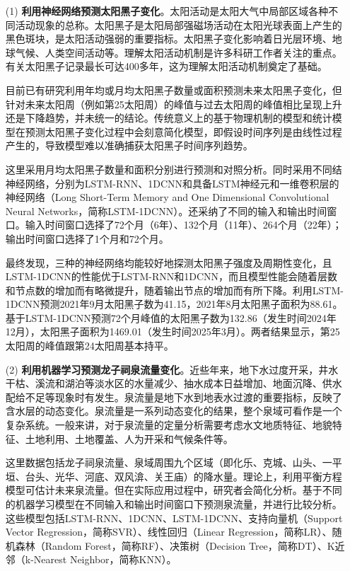 \begin{enumerate}

  \item[(1)] \textbf{利用神经网络预测太阳黑子变化}。太阳活动是太阳大气中局部区域各种不同活动现象的总称。太阳黑子是太阳局部强磁场活动在太阳光球表面上产生的黑色斑块，是太阳活动强弱的重要指标。太阳黑子变化影响着日光层环境、地球气候、人类空间活动等。理解太阳活动机制是许多科研工作者关注的重点。有关太阳黑子记录最长可达400多年，这为理解太阳活动机制奠定了基础。

  目前已有研究利用年均或月均太阳黑子数量或面积预测未来太阳黑子变化，但针对未来太阳周（例如第25太阳周）的峰值与过去太阳周的峰值相比呈现上升还是下降趋势，并未统一的结论。传统意义上的基于物理机制的模型和统计模型在预测太阳黑子变化过程中会刻意简化模型，即假设时间序列是由线性过程产生的，导致模型难以准确捕获太阳黑子时间序列趋势。
  
  这里采用月均太阳黑子数量和面积分别进行预测和对照分析。同时采用不同结神经网络，分别为LSTM-RNN、1DCNN和具备LSTM神经元和一维卷积层的神经网络（Long Short-Term Memory and One Dimensional Convolutional Neural Networks，简称LSTM-1DCNN）。还采纳了不同的输入和输出时间窗口。输入时间窗口选择了72个月（6年）、132个月（11年）、264个月（22年）；输出时间窗口选择了1个月和72个月。
  
  最终发现，三种的神经网络均能较好地探测太阳黑子强度及周期性变化，且LSTM-1DCNN的性能优于LSTM-RNN和1DCNN，而且模型性能会随着层数和节点数的增加而有略微提升，随着输出节点的增加而有所下降。利用LSTM-1DCNN预测2021年9月太阳黑子数为41.15，2021年8月太阳黑子面积为88.61。基于LSTM-1DCNN预测72个月峰值的太阳黑子数为132.86（发生时间2024年12月），太阳黑子面积为1469.01（发生时间2025年3月）。两者结果显示，第25太阳周的峰值跟第24太阳周基本持平。

  \item[{(2)}] \textbf{利用机器学习预测龙子祠泉流量变化}。近些年来，地下水过度开采，井水干枯、溪流和湖泊等淡水区的水量减少、抽水成本日益增加、地面沉降、供水配给不足等现象时有发生。泉流量是地下水到地表水过渡的重要指标，反映了含水层的动态变化。泉流量是一系列动态变化的结果，整个泉域可看作是一个复杂系统。一般来讲，对于泉流量的定量分析需要考虑水文地质特征、地貌特征、土地利用、土地覆盖、人为开采和气候条件等。
  
  这里数据包括龙子祠泉流量、泉域周围九个区域（即化乐、克城、山头、一平垣、台头、光华、河底、双风渰、关王庙）的降水量。理论上，利用平衡方程模型可估计未来泉流量。但在实际应用过程中，研究者会简化分析。基于不同的机器学习模型在不同输入和输出时间窗口下预测泉流量，并进行比较分析。这些模型包括LSTM-RNN、1DCNN、LSTM-1DCNN、支持向量机（Support Vector Regression，简称SVR）、线性回归（Linear Regression，简称LR）、随机森林（Random Forest，简称RF）、决策树（Decision Tree，简称DT）、K近邻（k-Nearest Neighbor，简称KNN）。
  

\end{enumerate}

